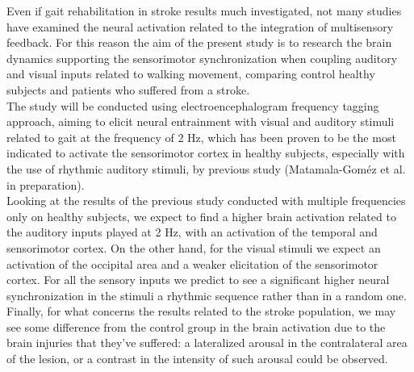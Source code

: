 Even if gait rehabilitation in stroke results much investigated, not many studies have examined the neural activation related to the integration of multisensory feedback. For this reason the aim of the present study is to research the brain dynamics supporting the sensorimotor synchronization when coupling auditory and visual inputs related to walking movement, comparing control healthy subjects and patients who suffered from a stroke. \\
The study will be conducted using electroencephalogram frequency tagging approach, aiming to elicit neural entrainment with visual and auditory stimuli related to gait at the frequency of 2 Hz, which has been proven to be the most indicated to activate the sensorimotor cortex in healthy subjects, especially with the use of rhythmic auditory stimuli, by previous study (Matamala-Goméz et al. in preparation).\\
Looking at the results of the previous study conducted with multiple frequencies only on healthy subjects, we expect to find a higher brain activation related to the auditory inputs played at 2 Hz, with an activation of the temporal and sensorimotor cortex. On the other hand, for the visual stimuli we expect an activation of the occipital area and a weaker elicitation of the sensorimotor cortex. For all the sensory inputs we predict to see a significant higher neural synchronization in the stimuli a rhythmic sequence rather than in a random one. \\
Finally, for what concerns the results related to the stroke population, we may see some difference from the control group in the brain activation due to the brain injuries that they've suffered: a lateralized arousal in the contralateral area of the lesion, or a contrast in the intensity of such arousal could be observed.

